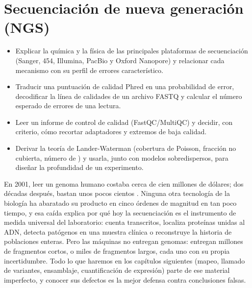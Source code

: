 \chapter{Secuenciación de nueva generación (NGS)}\label{cap:06}


\begin{objetivos}
\begin{itemize}
  \item Explicar la química y la física de las principales plataformas de secuenciación (Sanger, 454, Illumina, PacBio y Oxford Nanopore) y relacionar cada mecanismo con su perfil de errores característico.
  \item Traducir una puntuación de calidad Phred en una probabilidad de error, decodificar la línea de calidades de un archivo FASTQ y calcular el número esperado de errores de una lectura.
  \item Leer un informe de control de calidad (FastQC/MultiQC) y decidir, con criterio, cómo recortar adaptadores y extremos de baja calidad.
  \item Derivar la teoría de Lander-Waterman (cobertura de Poisson, fracción no cubierta, número de ) y usarla, junto con modelos sobredispersos, para diseñar la profundidad de un experimento.
\end{itemize}
\end{objetivos}

En 2001, leer un genoma humano costaba cerca de cien millones de dólares; dos décadas después, bastan unos pocos cientos \parencite{c06-nhgri2022}. Ninguna otra tecnología de la biología ha abaratado su producto en cinco órdenes de magnitud en tan poco tiempo, y esa caída explica por qué hoy la secuenciación es el instrumento de medida universal del laboratorio: cuenta transcritos, localiza proteínas unidas al ADN, detecta patógenos en una muestra clínica o reconstruye la historia de poblaciones enteras. Pero las máquinas no entregan genomas: entregan millones de fragmentos cortos, o miles de fragmentos largos, cada uno con su propia incertidumbre. Todo lo que haremos en los capítulos siguientes (mapeo, llamado de variantes, ensamblaje, cuantificación de expresión) parte de ese material imperfecto, y conocer sus defectos es la mejor defensa contra conclusiones falsas.

